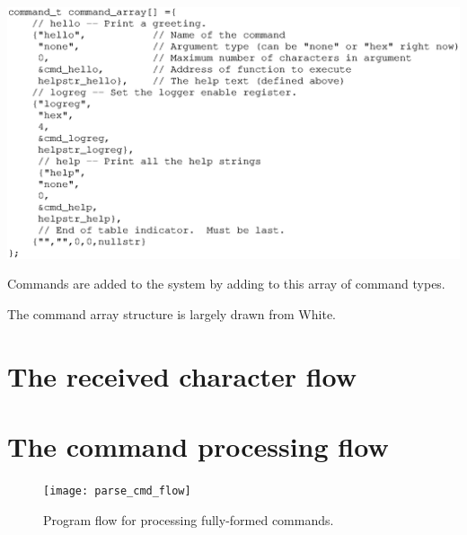 \begin{listing}[ht]
    \begin{center}
        \includegraphics[clip,scale=0.75]{command_array}
        \caption{Commands are added to the system by adding to this array of command types.\label{lst:cmdarray}}
    \end{center}
\end{listing}

The command array structure is largely drawn from White\cite{bok:white2012}.



\clearpage{}
\section{The received character flow}








\clearpage{}
\section{The command processing flow}

\begin{figure}[ht]
    \begin{center}
        \texttt{[image: parse\_cmd\_flow]}
        \caption{Program flow for processing fully-formed commands.\label{fig:cmdflow}}
    \end{center}
\end{figure}






